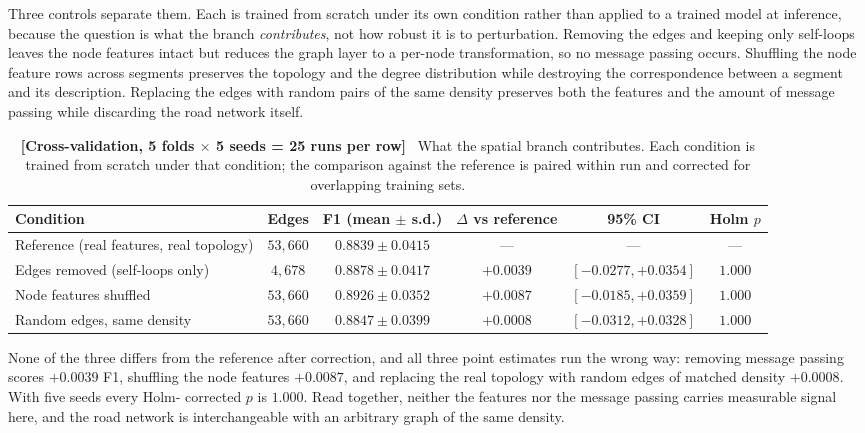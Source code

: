 \documentclass[journal]{IEEEtran}
\begin{document}
Three controls separate them. Each is trained from scratch under its own
condition rather than applied to a trained model at inference, because the
question is what the branch \emph{contributes}, not how robust it is to
perturbation. Removing the edges and keeping only self-loops leaves the node
features intact but reduces the graph layer to a per-node transformation, so
no message passing occurs. Shuffling the node feature rows across segments
preserves the topology and the degree distribution while destroying the
correspondence between a segment and its description. Replacing the edges with
random pairs of the same density preserves both the features and the amount of
message passing while discarding the road network itself.


\begin{table}[!t]
  \centering
  \caption{\textbf{[Cross-validation, 5 folds $\times$ 5 seeds = 25 runs per
  row]}~ What the spatial branch contributes. Each condition is trained from
  scratch under that condition; the comparison against the reference is paired
  within run and corrected for overlapping training sets.}
  \label{tab:graph_controls}
  \renewcommand{\arraystretch}{1.2}
  \footnotesize
  \begin{tabular}{@{}lcccc c@{}}
    \toprule
    \textbf{Condition} & \textbf{Edges} & \textbf{F1 (mean $\pm$ s.d.)}
    & \textbf{$\Delta$ vs reference} & \textbf{95\% CI} & \textbf{Holm $p$} \\ \midrule
    Reference (real features, real topology) & $53{,}660$ & $0.8839 \pm 0.0415$ & --- & --- & --- \\
    Edges removed (self-loops only) & $4{,}678$ & $0.8878 \pm 0.0417$ & $+0.0039$ & $[-0.0277, +0.0354]$ & $1.000$ \\
    Node features shuffled & $53{,}660$ & $0.8926 \pm 0.0352$ & $+0.0087$ & $[-0.0185, +0.0359]$ & $1.000$ \\
    Random edges, same density & $53{,}660$ & $0.8847 \pm 0.0399$ & $+0.0008$ & $[-0.0312, +0.0328]$ & $1.000$ \\
    \bottomrule
  \end{tabular}
\end{table}

None of the three differs from the reference after correction, and all three
point estimates run the wrong way: removing message passing scores $+0.0039$
F1, shuffling the node features $+0.0087$, and replacing the real topology
with random edges of matched density $+0.0008$. With five seeds every Holm-
corrected $p$ is $1.000$. Read together,
neither the features nor the message passing carries measurable signal here,
and the road network is interchangeable with an arbitrary graph of the same
density.
\end{document}
